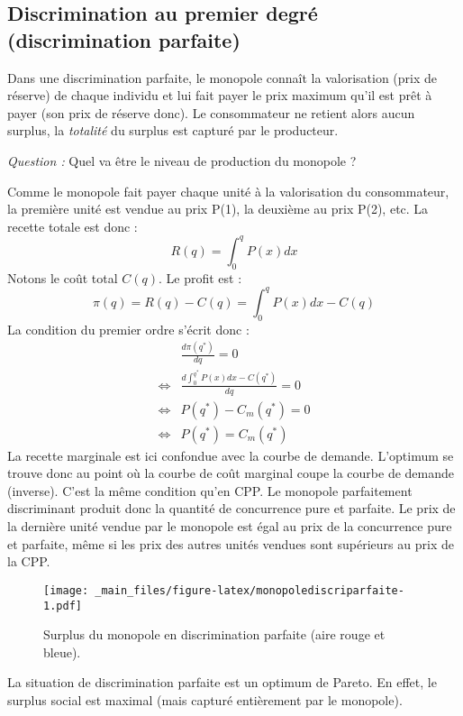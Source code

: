 \documentclass[
]{book}
\theoremstyle{definition}
\theoremstyle{definition}
\theoremstyle{definition}
\theoremstyle{definition}
\theoremstyle{remark}
\begin{document}
\hypertarget{discrimination-au-premier-degruxe9-discrimination-parfaite}{%
\subsection{Discrimination au premier degré (discrimination parfaite)}\label{discrimination-au-premier-degruxe9-discrimination-parfaite}}

Dans une discrimination parfaite, le monopole connaît la valorisation (prix de réserve) de chaque individu et lui fait payer le prix maximum qu'il est prêt à payer (son prix de réserve donc).
Le consommateur ne retient alors aucun surplus, la \emph{totalité} du surplus est capturé par le producteur.

\emph{Question :} Quel va être le niveau de production du monopole ?

Comme le monopole fait payer chaque unité à la valorisation du consommateur, la première unité est vendue au prix P(1), la deuxième au prix P(2), etc.
La recette totale est donc :
\[
R(q) = \int_0^q P(x) dx
\]
Notons le coût total \(C(q)\).
Le profit est :
\[
\pi(q) = R(q) - C(q) = \int_0^q P(x) dx -C(q)
\]
La condition du premier ordre s'écrit donc :
\[
\begin{array}{rl}
&\frac{d\pi(q^*)}{dq} = 0\\
\Leftrightarrow & \frac{d\int_0^{q^*} P(x) dx -C(q^*)}{dq} = 0\\
\Leftrightarrow & P(q^*) - C_m(q^*) = 0\\
\Leftrightarrow & P(q^*) = C_m(q^*)
\end{array}
\]
La recette marginale est ici confondue avec la courbe de demande.
L'optimum se trouve donc au point où la courbe de coût marginal coupe la courbe de demande (inverse).
C'est la même condition qu'en CPP.
Le monopole parfaitement discriminant produit donc la quantité de concurrence pure et parfaite.
Le prix de la dernière unité vendue par le monopole est égal au prix de la concurrence pure et parfaite, même si les prix des autres unités vendues sont supérieurs au prix de la CPP.

\begin{figure}
\centering
\texttt{[image: \_main\_files/figure-latex/monopolediscriparfaite-1.pdf]}
\caption{\label{fig:monopolediscriparfaite}Surplus du monopole en discrimination parfaite (aire rouge et bleue).}
\end{figure}

La situation de discrimination parfaite est un optimum de Pareto.
En effet, le surplus social est maximal (mais capturé entièrement par le monopole).
\end{document}
